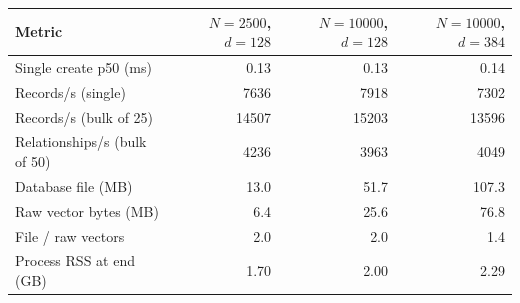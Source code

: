 \begin{tabular}{lrrr}
\toprule
Metric & $N{=}\num{2500}$, $d{=}128$ & $N{=}\num{10000}$, $d{=}128$ & $N{=}\num{10000}$, $d{=}384$ \\
\midrule
Single create p50 (ms) & 0.13 & 0.13 & 0.14 \\
Records/s (single) & 7636 & 7918 & 7302 \\
Records/s (bulk of 25) & 14507 & 15203 & 13596 \\
Relationships/s (bulk of 50) & 4236 & 3963 & 4049 \\
Database file (MB) & 13.0 & 51.7 & 107.3 \\
Raw vector bytes (MB) & 6.4 & 25.6 & 76.8 \\
File / raw vectors & 2.0 & 2.0 & 1.4 \\
Process RSS at end (GB) & 1.70 & 2.00 & 2.29 \\
\bottomrule
\end{tabular}
